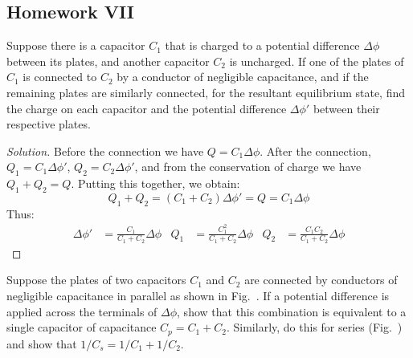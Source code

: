 \documentclass[crop=false,class=book,oneside]{standalone}
\begin{document}
        \subsection{Homework VII}
            \begin{problem}[Wangsness 6-6]
                Suppose there is a capacitor $C_{1}$ that is charged
                to a potential difference $\Delta\phi$
                between its plates, and another capacitor
                $C_{2}$ is uncharged. If one of the plates
                of $C_{1}$ is connected to $C_{2}$ by
                a conductor of negligible capacitance, and
                if the remaining plates are similarly connected,
                for the resultant equilibrium state, find the
                charge on each capacitor and the potential
                difference $\Delta\phi'$ between their respective
                plates.
            \end{problem}
            \begin{proof}[Solution]
                Before the connection we have
                $Q=C_{1}\Delta\phi$.
                After the connection, $Q_{1}=C_{1}\Delta\phi'$,
                $Q_{2}=C_{2}\Delta\phi'$, and from the
                conservation of charge we have $Q_{1}+Q_{2}=Q$.
                Putting this together, we obtain:
                \begin{equation*}
                    Q_{1}+Q_{2}
                    =(C_{1}+C_{2})\Delta\phi'
                    =Q
                    =C_{1}\Delta\phi
                \end{equation*}
                Thus:
                \begin{align*}
                    \Delta\phi'
                    &=\frac{C_{1}}{C_{1}+C_{2}}\Delta\phi
                    &
                    Q_{1}
                    &=\frac{C_{1}^{2}}{C_{1}+C_{2}}\Delta\phi
                    &
                    Q_{2}
                    &=\frac{C_{1}C_{2}}{C_{1}+C_{2}}\Delta\phi
                \end{align*}
            \end{proof}
            \begin{problem}[Wangsness 6-7]
                \label{Problem:EMAG_Wangsness_6_7}
                Suppose the plates of two capacitors
                $C_{1}$ and $C_{2}$ are connected by conductors
                of negligible capacitance in parallel as shown
                in Fig.~.
                If a potential difference is applied across the
                terminals of $\Delta\phi$, show that this
                combination is equivalent to a single capacitor
                of capacitance $C_{p}=C_{1}+C_{2}$. Similarly, do
                this for series
                (Fig.~)
                and show that $1/C_{s}=1/C_{1}+1/C_{2}$.
            \end{problem}
\end{document}

